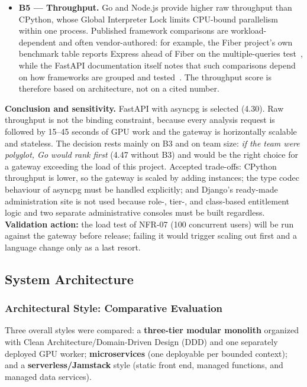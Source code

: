\documentclass[a4paper]{article}
\begin{document}
\begin{itemize}
    \item \textbf{B5 --- Throughput.} Go and Node.js provide higher raw throughput than CPython, whose Global Interpreter Lock limits CPU-bound parallelism within one process. Published framework comparisons are workload-dependent and often vendor-authored: for example, the Fiber project's own benchmark table reports Express ahead of Fiber on the multiple-queries test~\cite{fiber_benchmarks}, while the FastAPI documentation itself notes that such comparisons depend on how frameworks are grouped and tested~\cite{fastapi_benchmarks}. The throughput score is therefore based on architecture, not on a cited number.
\end{itemize}

\textbf{Conclusion and sensitivity.} FastAPI with asyncpg is selected (4.30). Raw throughput is not the binding constraint, because every analysis request is followed by 15--45 seconds of GPU work and the gateway is horizontally scalable and stateless. The decision rests mainly on B3 and on team size: \emph{if the team were polyglot, Go would rank first} (4.47 without B3) and would be the right choice for a gateway exceeding the load of this project. Accepted trade-offs: CPython throughput is lower, so the gateway is scaled by adding instances; the type codec behaviour of asyncpg must be handled explicitly; and Django's ready-made administration site is not used because role-, tier-, and class-based entitlement logic and two separate administrative consoles must be built regardless. \textbf{Validation action:} the load test of NFR-07 (100 concurrent users) will be run against the gateway before release; failing it would trigger scaling out first and a language change only as a last resort.

\subsection{System Architecture}\label{sec:system_architecture}

\subsubsection{Architectural Style: Comparative Evaluation}

Three overall styles were compared: a \textbf{three-tier modular monolith} organized with Clean Architecture/Domain-Driven Design (DDD) and one separately deployed GPU worker; \textbf{microservices} (one deployable per bounded context); and a \textbf{serverless/Jamstack} style (static front end, managed functions, and managed data services).
\end{document}
